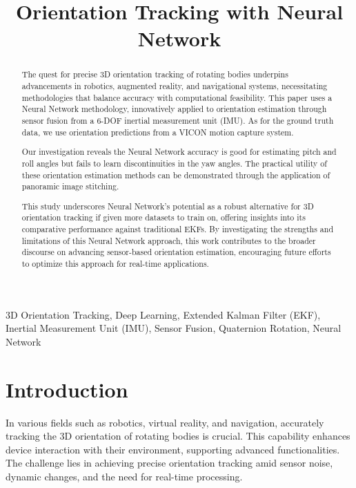 \documentclass[conference]{IEEEtran}
\begin{document}
\title{Orientation Tracking with Neural Network}

\author{
}

\maketitle

\begin{abstract}
The quest for precise 3D orientation tracking of rotating bodies underpins advancements in robotics, augmented reality, and navigational systems, necessitating methodologies that balance accuracy with computational feasibility. This paper uses a Neural Network methodology, innovatively applied to orientation estimation through sensor fusion from a 6-DOF inertial measurement unit (IMU). As for the ground truth data, we use orientation predictions from a VICON motion capture system.

Our investigation reveals the Neural Network accuracy is good for estimating pitch and roll angles but fails to learn discontinuities in the yaw angles. The practical utility of these orientation estimation methods can be demonstrated through the application of panoramic image stitching.

This study underscores Neural Network's potential as a robust alternative for 3D orientation tracking if given more datasets to train on, offering insights into its comparative performance against traditional EKFs. By investigating the strengths and limitations of this Neural Network approach, this work contributes to the broader discourse on advancing sensor-based orientation estimation, encouraging future efforts to optimize this approach for real-time applications.
\end{abstract}

\begin{IEEEkeywords}
3D Orientation Tracking, Deep Learning, Extended Kalman Filter (EKF), Inertial Measurement Unit (IMU), Sensor Fusion, Quaternion Rotation, Neural Network
\end{IEEEkeywords}

\section{Introduction}
In various fields such as robotics, virtual reality, and navigation, accurately tracking the 3D orientation of rotating bodies is crucial. This capability enhances device interaction with their environment, supporting advanced functionalities. The challenge lies in achieving precise orientation tracking amid sensor noise, dynamic changes, and the need for real-time processing.
\end{document}
